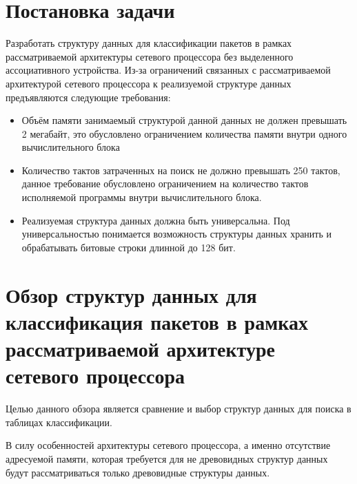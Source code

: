 \documentclass[a4peper, 12pt, titlepage, finall]{report}
\begin{document}
    \chapter{Постановка задачи} 
        Разработать структуру данных для классификации пакетов в рамках рассматриваемой архитектуры сетевого процессора без выделенного ассоциативного устройства. 
        Из-за ограничений связанных с рассматриваемой архитектурой сетевого процессора к реализуемой структуре данных предъявляются следующие требования:
        \begin{itemize}
            \item Объём памяти занимаемый структурой данной данных не должен превышать 2 мегабайт, это обусловлено ограничением количества памяти внутри одного вычислительного блока
            \item Количество тактов затраченных на поиск не должно превышать 250 тактов, данное требование обусловлено ограничением на количество тактов исполняемой программы внутри
                вычислительного блока.
            \item Реализуемая структура данных должна быть универсальна. Под универсальностью понимается возможность структуры данных хранить и обрабатывать битовые строки длинной до 128 бит.
        \end{itemize}
    \chapter{Обзор структур данных для классификация пакетов в рамках рассматриваемой архитектуре сетевого процессора}
            Целью данного обзора является сравнение и выбор структур данных для поиска в таблицах классификации. 

            В силу особенностей архитектуры сетевого процессора, а именно отсутствие адресуемой памяти, 
            которая требуется для не древовидных структур данных будут рассматриваться только древовидные структуры данных. 
        
\end{document}
